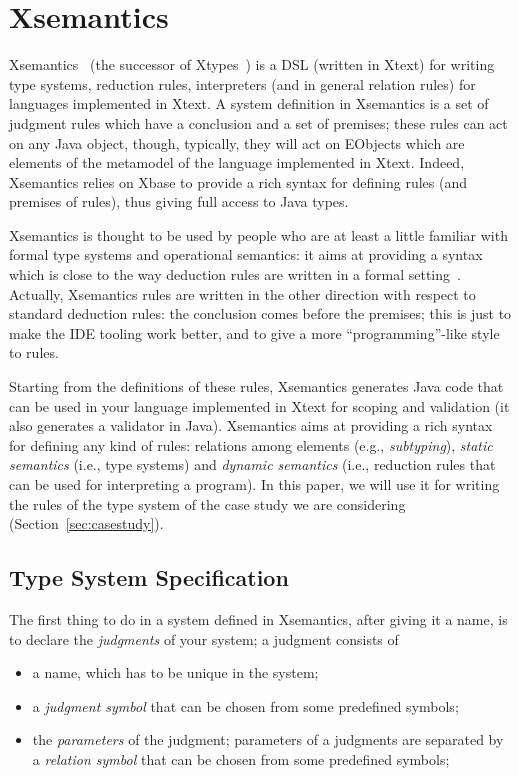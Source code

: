 \section{Xsemantics}
\label{sec:xsemantics}

Xsemantics~\cite{lbts} (the successor of Xtypes~\cite{Bet11}) is a DSL (written
in Xtext) for writing type systems, reduction rules, interpreters (and in
general relation rules) for languages implemented in Xtext.
A system definition in Xsemantics is a set of judgment rules which have a
conclusion and a set of premises; these rules can act on any Java object,
though, typically, they will act on EObjects which are elements of the metamodel
of the language implemented in Xtext.  Indeed, Xsemantics relies on Xbase to
provide a rich syntax for defining rules (and premises of rules), thus giving
full access to Java types.

Xsemantics is thought to be used by people who are at least a little familiar
with formal type systems and operational semantics: it aims at providing
a syntax which is close to the way deduction rules are written in a formal
setting~\cite{hindley:1997a,Pierce02}.
Actually, Xsemantics rules are written in the other direction with respect
to standard deduction rules: the conclusion comes before the premises; this is
just to make the IDE tooling work better, and to give a more ``programming''-like
style to rules.

Starting from the definitions of these rules, Xsemantics generates Java code
that can be used in your language implemented in Xtext for scoping and
validation (it also generates a validator in Java).  Xsemantics aims at
providing a rich syntax for defining any kind of rules: relations among elements
(e.g., \emph{subtyping}), \emph{static semantics} (i.e., type systems) and
\emph{dynamic semantics} (i.e., reduction rules that can be used for
interpreting a program).  In this paper, we will use it for writing the rules of
the type system of the case study we are considering
(Section~\ref{sec:casestudy}).

\subsection{Type System Specification}

The first thing to do in a system defined in Xsemantics, after giving it a name,
is to declare the \emph{judgments} of your system; a judgment consists of

\begin{itemize}
\item 
a name, which has to be unique in the system;
\item 
a \textit{judgment symbol} that can be chosen from some predefined symbols;
\item 
the \textit{parameters} of the judgment; parameters of a judgments are separated by
	a \textit{relation symbol} that can be chosen from some predefined symbols;
\end{itemize}

